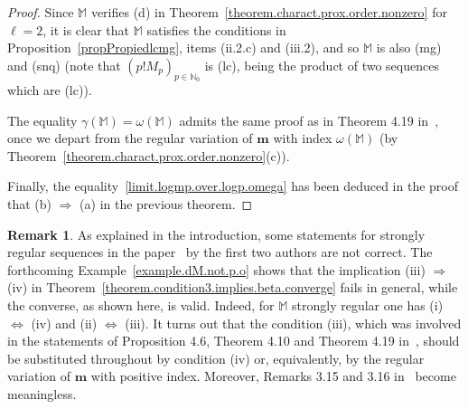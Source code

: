 \documentclass[11pt,a4paper]{article}
\theoremstyle{definition}
\newtheorem{rema}[theo]{Remark}
\def\o{\omega}
\def\N{\mathbb{N}}
\def\M{\mathbb{M}}
\def\m{\boldsymbol{m}}
\begin{document}
\begin{proof}
Since $\M$ verifies (d) in Theorem~\ref{theorem.charact.prox.order.nonzero} for $\ell=2$, it is clear that $\M$ satisfies the conditions in Proposition~\ref{propPropiedlcmg}, items (ii.2.c) and (iii.2), and so $\M$ is also (mg) and (snq) (note that $(p!M_p)_{p\in\N_0}$ is (lc), being the product of two sequences which are (lc)).

The equality $\gamma(\M)=\o(\M)$ admits the same proof as in Theorem 4.19 in~\cite{JimenezSanz}, once we depart from the regular variation of $\m$ with index $\o(\M)$ (by Theorem~\ref{theorem.charact.prox.order.nonzero}(c)).

Finally, the equality~\eqref{limit.logmp.over.logp.omega} has been deduced in the proof that (b) $\Rightarrow$ (a) in the previous theorem.
\end{proof}

\begin{rema}\label{remaCorrections}
As explained in the introduction, some statements for strongly regular sequences in the paper~\cite{JimenezSanz} by the first two authors are not correct. The forthcoming Example~\ref{example.dM.not.p.o} shows that the implication (iii) $\Rightarrow$ (iv) in Theorem~\ref{theorem.condition3.implies.beta.converge} fails in general, while the converse, as shown here, is valid. Indeed, for $\M$ strongly regular one has (i) $\Leftrightarrow$ (iv) and (ii) $\Leftrightarrow$ (iii). It turns out that the condition (iii), which was involved in the statements of Proposition 4.6, Theorem 4.10 and Theorem 4.19 in~\cite{JimenezSanz}, should be substituted throughout by condition (iv) or, equivalently, by the regular variation of $\m$ with positive index. Moreover, Remarks 3.15 and 3.16 in~\cite{JimenezSanz} become meaningless.
\end{rema}
\end{document}
